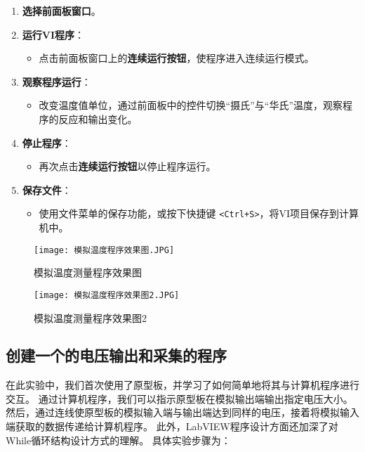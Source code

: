 \documentclass[UTF-8,twoside,cs4size]{ctexart}
\begin{document}
\begin{enumerate}
    \item \textbf{选择前面板窗口}。
    
    \item \textbf{运行VI程序}：
    \begin{itemize}
        \item 点击前面板窗口上的\textbf{连续运行按钮}，使程序进入连续运行模式。
    \end{itemize}
    
    \item \textbf{观察程序运行}：
    \begin{itemize}
        \item 改变温度值单位，通过前面板中的控件切换“摄氏”与“华氏”温度，观察程序的反应和输出变化。
    \end{itemize}
    
    \item \textbf{停止程序}：
    \begin{itemize}
        \item 再次点击\textbf{连续运行按钮}以停止程序运行。
    \end{itemize}

    \item \textbf{保存文件}：
    \begin{itemize}
        \item 使用文件菜单的保存功能，或按下快捷键 \texttt{<Ctrl+S>}，将VI项目保存到计算机中。
    \end{itemize}
\end{enumerate}

\begin{figure}[!h]
    \centering
    \begin{minipage}[b]{0.45\linewidth}
        \centering
        \texttt{[image: 模拟温度程序效果图.JPG]}
        \caption{模拟温度测量程序效果图}
    \end{minipage}
    \quad %
    \begin{minipage}[b]{0.45\linewidth}
        \centering
        \texttt{[image: 模拟温度程序效果图2.JPG]}
        \caption{模拟温度测量程序效果图2}
    \end{minipage}
\end{figure}

\subsection{创建一个的电压输出和采集的程序}
在此实验中，我们首次使用了原型板，并学习了如何简单地将其与计算机程序进行交互。
通过计算机程序，我们可以指示原型板在模拟输出端输出指定电压大小。
然后，通过连线使原型板的模拟输入端与输出端达到同样的电压，接着将模拟输入端获取的数据传递给计算机程序。
此外，LabVIEW程序设计方面还加深了对While循环结构设计方式的理解。
具体实验步骤为：
\end{document}
